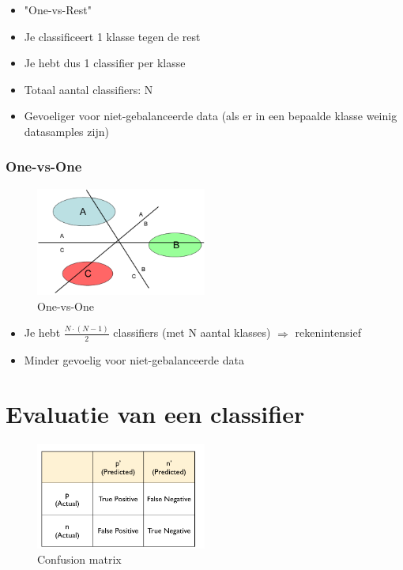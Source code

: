 \documentclass{article}
\begin{document}
\begin{itemize}
    \item "One-vs-Rest"
    \item Je classificeert 1 klasse tegen de rest
    \item Je hebt dus 1 classifier per klasse
    \item Totaal aantal classifiers: N
    \item Gevoeliger voor niet-gebalanceerde data (als er in een bepaalde klasse weinig datasamples zijn)
\end{itemize}

\subsubsection{One-vs-One}

\begin{figure}[H]
    \centering
    \includegraphics[width=0.5\textwidth]{multi-class-classification2.png}
    \caption{One-vs-One}
\end{figure}

\begin{itemize}
    \item Je hebt $\frac{N\cdot(N-1)}{2}$ classifiers (met N aantal klasses) $\Rightarrow$ rekenintensief
    \item Minder gevoelig voor niet-gebalanceerde data
\end{itemize}

\section{Evaluatie van een classifier}

\begin{figure}[H]
    \centering
    \includegraphics[width=0.5\textwidth]{truth-table.png}
    \caption{Confusion matrix}
\end{figure}
\end{document}
